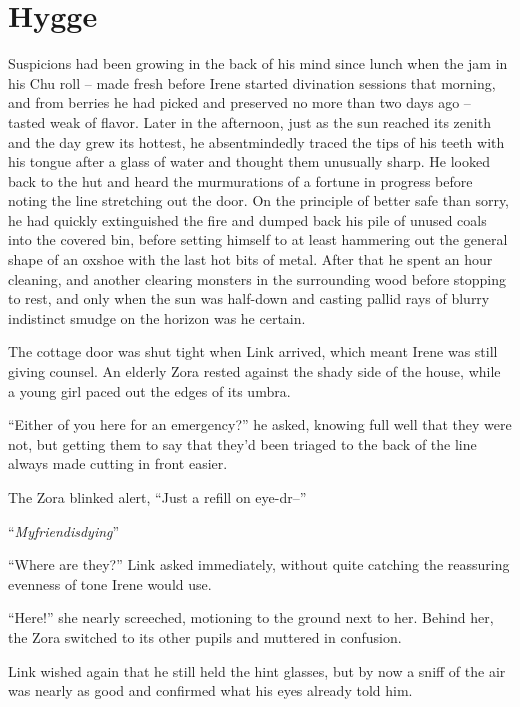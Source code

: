 \documentclass[../../FGP.tex]{subfiles}
\begin{document}
\section{Hygge}
Suspicions had been growing in the back of his mind since lunch when the jam in his Chu roll -- made fresh before Irene started divination sessions that morning, and from berries he had picked and preserved no more than two days ago -- tasted weak of flavor. Later in the afternoon, just as the sun reached its zenith and the day grew its hottest, he absentmindedly traced the tips of his teeth with his tongue after a glass of water and thought them unusually sharp. He looked back to the hut and heard the murmurations of a fortune in progress before noting the line stretching out the door. On the principle of better safe than sorry, he had quickly extinguished the fire and dumped back his pile of unused coals into the covered bin, before setting himself to at least hammering out the general shape of an oxshoe with the last hot bits of metal. After that he spent an hour cleaning, and another clearing monsters in the surrounding wood before stopping to rest, and only when the sun was half-down and casting pallid rays of blurry indistinct smudge on the horizon was he certain.

The cottage door was shut tight when Link arrived, which meant Irene was still giving counsel. An elderly Zora rested against the shady side of the house, while a young girl paced out the edges of its umbra.

``Either of you here for an emergency?'' he asked, knowing full well that they were not, but getting them to say that they'd been triaged to the back of the line always made cutting in front easier.

The Zora blinked alert, ``Just a refill on eye-dr--''  

``\emph{Myfriendisdying}'' 

``Where are they?'' Link asked immediately, without quite catching the reassuring evenness of tone Irene would use.  %

``Here!'' she nearly screeched, motioning to the ground next to her. Behind her, the Zora  switched to its other pupils and muttered in confusion.

Link wished again that he still held the hint glasses, but by now a sniff of the air was nearly as good and confirmed what his eyes already told him.
\end{document}
